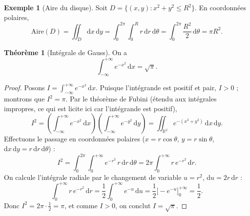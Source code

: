 \documentclass[12pt,a4paper,openany]{book}
\theoremstyle{definition}
\newtheorem{theoreme}{Théorème}[chapter]
\newtheorem{exemple}{Exemple}[chapter]
\newcommand{\R}{\mathbb{R}}
\newcommand{\dd}{\mathrm{d}}
\begin{document}
\begin{center}
\end{center}

\begin{exemple}[Aire du disque]\label{ex:aire-disque-polaire}
  Soit $D = \{(x,y) : x^2 + y^2 \leqslant R^2\}$. En coordonnées
  polaires,
  \[
    \text{Aire}(D) = \iint_D \dd x\,\dd y
    = \int_0^{2\pi}\!\int_0^R r\,\dd r\,\dd\theta
    = \int_0^{2\pi}\frac{R^2}{2}\,\dd\theta = \pi R^2.
  \]
\end{exemple}

\begin{theoreme}[Intégrale de Gauss]
  \label{thm:integrale-gauss}
  On a
  \begin{equation}\label{eq:gauss}
    \int_{-\infty}^{+\infty} e^{-x^2}\,\dd x = \sqrt{\pi}.
  \end{equation}
\end{theoreme}

\begin{proof}
  Posons $I = \int_{-\infty}^{+\infty} e^{-x^2}\,\dd x$. Puisque
  l'intégrande est positif et pair, $I > 0$ ; montrons que $I^2 = \pi$.
  Par le théorème de Fubini (étendu aux
  intégrales impropres, ce qui est licite ici car l'intégrande est
  positif),
  \[
    I^2 = \left(\int_{-\infty}^{+\infty} e^{-x^2}\,\dd x\right)
    \left(\int_{-\infty}^{+\infty} e^{-y^2}\,\dd y\right)
    = \iint_{\R^2} e^{-(x^2+y^2)}\,\dd x\,\dd y.
  \]
  Effectuons le passage en coordonnées polaires
  ($x = r\cos\theta$, $y = r\sin\theta$, $\dd x\,\dd y = r\,\dd r\,\dd\theta$) :
  \[
    I^2 = \int_0^{2\pi}\!\int_0^{+\infty} e^{-r^2}\,r\,\dd r\,\dd\theta
    = 2\pi \int_0^{+\infty} r\,e^{-r^2}\,\dd r.
  \]
  On calcule l'intégrale radiale par le changement de variable
  $u = r^2$, $\dd u = 2r\,\dd r$ :
  \[
    \int_0^{+\infty} r\,e^{-r^2}\,\dd r
    = \frac{1}{2}\int_0^{+\infty} e^{-u}\,\dd u
    = \frac{1}{2}\bigl[-e^{-u}\bigr]_0^{+\infty}
    = \frac{1}{2}.
  \]
  Donc $I^2 = 2\pi \cdot \frac{1}{2} = \pi$, et comme $I > 0$, on
  conclut $I = \sqrt{\pi}$.
\end{proof}
\end{document}
